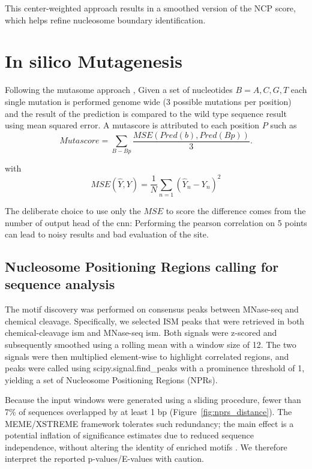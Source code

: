 \documentclass[11pt]{book}
\begin{document}
This center-weighted approach results in a smoothed version of the NCP score, which helps refine nucleosome boundary identification.

\section{In silico Mutagenesis}
Following the mutasome approach \cite{routhier_genome-wide_2021}, Given a set of nucleotides $B = {A, C, G, T}$ each single mutation is performed genome wide (3 possible mutations per position) and the result of the prediction is compared to the wild type sequence result using mean squared error. A mutascore is attributed to each position $P$ such as 
\begin{equation}
    Mutascore = \underset{B-Bp}{\sum} \frac{MSE(Pred(b), Pred(Bp))}{3}.
\end{equation}

with
\begin{equation}
    MSE(\hat{Y}, Y) = \frac{1}{N}\underset{n=1}{\sum}(\hat{Y}_n - Y_n)^2
\end{equation}

The deliberate choice to use only the $MSE$ to score the difference comes from the number of output head of the \gls{cnn}: Performing the pearson correlation on 5 points can lead to noisy results and bad evaluation of the site.

\subsection{Nucleosome Positioning Regions calling for sequence analysis}
The motif discovery was performed on consensus peaks between MNase-seq and chemical cleavage. Specifically, we selected ISM peaks that were retrieved in both chemical-cleavage \gls{ism} and MNase-seq \gls{ism}. Both signals were z-scored and subsequently smoothed using a rolling mean with a window size of 12. The two signals were then multiplied element-wise to highlight correlated regions, and peaks were called using scipy.signal.find\_peaks with a prominence threshold of 1, yielding a set of Nucleosome Positioning Regions (NPRs).

Because the input windows were generated using a sliding procedure, fewer than 7\% of sequences overlapped by at least 1 bp (Figure~\ref{fig:nprs_distance}). The MEME/XSTREME framework tolerates such redundancy; the main effect is a potential inflation of significance estimates due to reduced sequence independence, without altering the identity of enriched motifs \cite{bailey_meme_2009}. We therefore interpret the reported p-values/E-values with caution.
\end{document}

